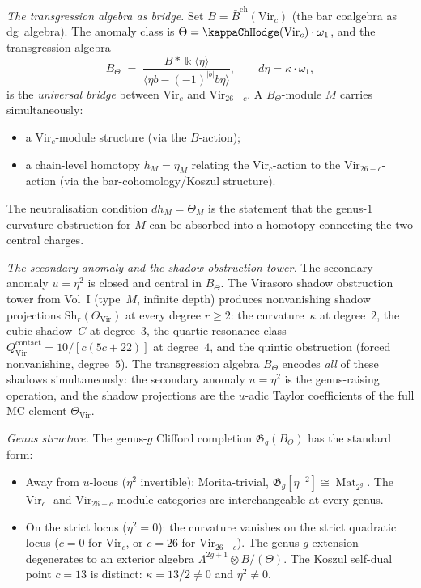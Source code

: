 \begin{computation}
\emph{The transgression algebra as bridge.}
Set $B=\bar B^{\mathrm{ch}}(\mathrm{Vir}_c)$
(the bar coalgebra as dg~algebra). The anomaly class is
$\Theta=\kappaChHodge(\mathrm{Vir}_c)\cdot\omega_1$, and the
transgression algebra
\[
B_\Theta
\;=\;
\frac{B*\Bbbk\langle\eta\rangle}
{\langle\eta b-(-1)^{|b|}b\eta\rangle},
\qquad
d\eta=\kappa\cdot\omega_1,
\]
is the \emph{universal bridge} between $\mathrm{Vir}_c$
and $\mathrm{Vir}_{26-c}$. A $B_\Theta$-module $M$
carries simultaneously:
\begin{itemize}
\item a $\mathrm{Vir}_c$-module structure (via the
 $B$-action);
\item a chain-level homotopy $h_M=\eta_M$ relating the
 $\mathrm{Vir}_c$-action to the $\mathrm{Vir}_{26-c}$-action
 (via the bar-cohomology/Koszul structure).
\end{itemize}
The neutralisation condition $dh_M=\Theta_M$ is the statement
that the genus-$1$ curvature obstruction for $M$ can be
absorbed into a homotopy connecting the two central charges.

\emph{The secondary anomaly and the shadow obstruction tower.}
The secondary anomaly $u=\eta^2$ is closed and central in
$B_\Theta$. The Virasoro shadow obstruction tower from Vol~I
(type~$M$, infinite depth) produces nonvanishing shadow
projections $\mathrm{Sh}_r(\Theta_{\mathrm{Vir}})$ at every
degree $r\ge 2$: the curvature~$\kappa$ at degree~$2$,
the cubic shadow~$C$ at degree~$3$, the quartic resonance
class $Q^{\mathrm{contact}}_{\mathrm{Vir}}
=10/[c(5c{+}22)]$ at degree~$4$, and the quintic obstruction
(forced nonvanishing, degree~$5$).
The transgression algebra $B_\Theta$ encodes
\emph{all} of these shadows simultaneously: the secondary
anomaly $u=\eta^2$ is the genus-raising operation, and the
shadow projections are the $u$-adic Taylor coefficients of
the full MC element $\Theta_{\mathrm{Vir}}$.

\emph{Genus structure.}
The genus-$g$ Clifford completion
$\mathfrak G_g(B_\Theta)$ has the standard form:
\begin{itemize}
\item Away from $u$-locus ($\eta^2$ invertible):
 Morita-trivial, $\mathfrak G_g[\eta^{-2}]\cong
 \operatorname{Mat}_{2^g}$. The $\mathrm{Vir}_c$- and
 $\mathrm{Vir}_{26-c}$-module categories are
 interchangeable at every genus.
\item On the strict locus ($\eta^2=0$):
 the curvature vanishes on the strict quadratic locus
 ($c=0$ for $\mathrm{Vir}_c$, or $c=26$ for
 $\mathrm{Vir}_{26-c}$).
 The genus-$g$ extension degenerates to an exterior algebra
 $\Lambda^{2g+1}\otimes B/(\Theta)$.
 The Koszul self-dual point $c=13$ is distinct:
 $\kappa = 13/2 \neq 0$ and $\eta^2 \neq 0$.
\end{itemize}


\end{computation}
